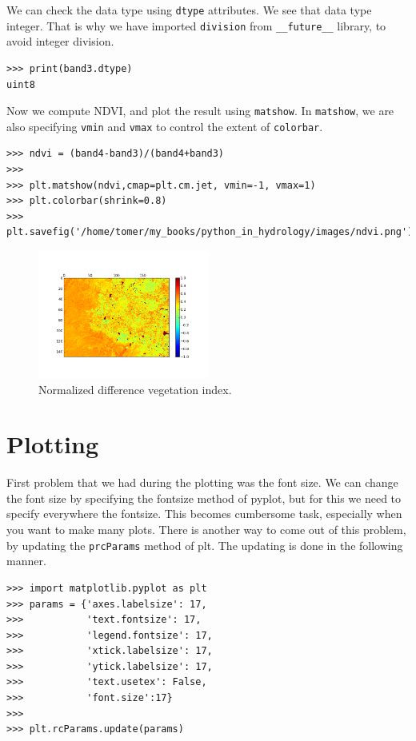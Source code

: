 \documentclass[10pt]{book}
\begin{document}
{We can check the data type using \verb"dtype" attributes. We see that data type integer. That is why we have imported \verb"division" from \verb"__future__" library, to avoid integer division. 
\beforeverb \begin{verbatim}
>>> print(band3.dtype)
uint8
\end{verbatim} \afterverb 

Now we compute NDVI, and plot the result using \verb"matshow". In \verb"matshow", we are also specifying \verb"vmin" and \verb"vmax" to control the extent of \verb"colorbar". 
\beforeverb \begin{verbatim}
>>> ndvi = (band4-band3)/(band4+band3)
>>> 
>>> plt.matshow(ndvi,cmap=plt.cm.jet, vmin=-1, vmax=1)
>>> plt.colorbar(shrink=0.8)
>>> plt.savefig('/home/tomer/my_books/python_in_hydrology/images/ndvi.png')
\end{verbatim} \afterverb

\beforefig
\begin{figure}[h!]
  \centering
    \includegraphics[width=0.5\textwidth]{images/ndvi.png}
  \caption{Normalized difference vegetation index.}
   \label{fig:ndvi}
\end{figure}
\afterfig


\chapter{Plotting}
First problem that we had during the plotting was the font size. We can change the font size by specifying the fontsize method of pyplot, but for this we need to specify everywhere the fontsize. This becomes cumbersome task, especially when you want to make many plots. There is another way to come out of this problem, by updating the \verb"prcParams" method of plt. The updating is done in the following manner. 

\beforeverb
\begin{verbatim}
>>> import matplotlib.pyplot as plt
>>> params = {'axes.labelsize': 17, 
>>>           'text.fontsize': 17,
>>>           'legend.fontsize': 17,
>>>           'xtick.labelsize': 17,
>>>           'ytick.labelsize': 17,
>>>           'text.usetex': False,
>>>           'font.size':17}
>>> 
>>> plt.rcParams.update(params)
\end{verbatim}
\afterverb
{}

}
\end{document}
